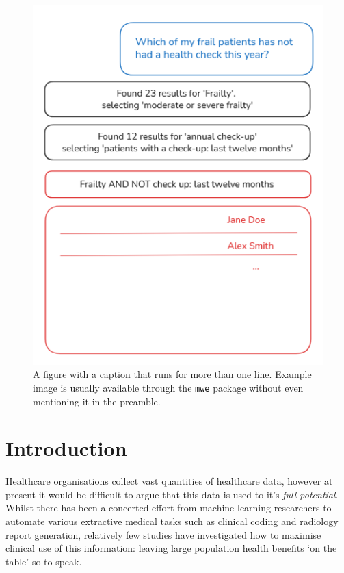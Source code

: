 \documentclass[11pt]{article}
\begin{document}
\begin{figure}[t]
  \includegraphics[width=\columnwidth]{content/chat_diagram.PNG}
  \caption{A figure with a caption that runs for more than one line.
    Example image is usually available through the \texttt{mwe} package
    without even mentioning it in the preamble.}
  \label{fig:experiments}
\end{figure}


\section{Introduction}

Healthcare organisations collect vast quantities of healthcare data, however at present it would be difficult to argue that this data is used to it's \textit{full potential}. Whilst there has been a concerted effort from machine learning researchers to automate various extractive medical tasks such as clinical coding and radiology report generation, relatively few studies have investigated how to maximise clinical use of this information: leaving large population health benefits `on the table' so to speak.
\end{document}

